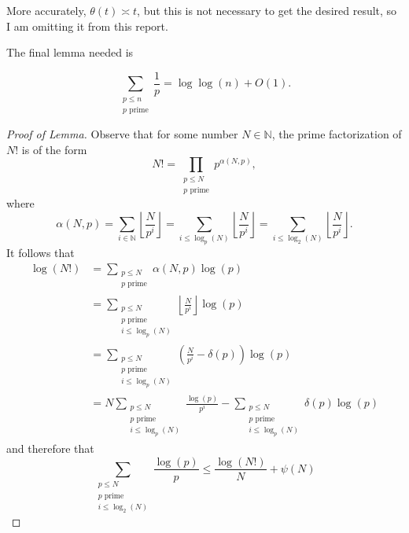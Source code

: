 \documentclass[12pt]{amsart}
\begin{document}
More accurately, \(\theta(t) \asymp t\), but this is not necessary to get the desired result,
so I am omitting it from this report.

The final lemma needed is
\begin{lemma*}
\[
    \sum _{\substack{ p \leq n \\ p\text{ prime}  }} \frac{1}{p}  = \log\log \left( n \right) + O(1)
.\]
\end{lemma*}

\begin{proof}[Proof of Lemma]
Observe that for some number \(N \in \mathbb{N} \), the prime factorization of \(N!\) is of the form
\[
    N! = \prod _{\substack{ p \leq N \\ p \text{ prime}  }} p ^{\alpha(N,p)}
,\]
where
\[
    \alpha(N,p) = \sum _{i \in \mathbb{N} } \left\lfloor \frac{N}{p ^{i}}  \right\rfloor = \sum _{i \leq \log _{p} \left( N \right) } \left\lfloor \frac{N}{p ^{i}}  \right\rfloor  =\sum _{i \leq \log _{2} \left( N \right) } \left\lfloor \frac{N}{p ^{i}}  \right\rfloor 
.\]
It follows that
\begin{align*}
    \log \left( N! \right) & = \sum _{\substack{ p \leq N \\p \text{ prime}  }} \alpha(N,p) \log \left( p \right) \\
    & = \sum _{\substack{ p \leq N \\p \text{ prime} \\ i \leq \log _{p} \left( N \right)   }} \left\lfloor \frac{N}{p ^{i}}  \right\rfloor \log \left( p \right) \\
    & = \sum _{\substack{ p \leq N \\ p \text{ prime} \\ i \leq \log _{p} \left( N \right)  }} \left( \frac{N}{p ^{i}} - \delta(p) \right) \log \left( p \right) \\
    & = N\sum _{\substack{ p \leq N \\ p \text{ prime} \\ i \leq \log _{p} \left( N \right) }} \frac{\log \left( p \right) }{p ^{i}} - \sum _{\substack{ p \leq N \\ p \text{ prime} \\ i \leq \log _{p} \left( N \right)  }} \delta(p) \log \left( p \right) 
\end{align*}
and therefore that
\[
    \sum _{\substack{ p \leq N \\ p \text{ prime} \\ i \leq \log _{2} \left( N \right)  }} \frac{\log \left( p \right) }{p} \leq  \frac{\log \left( N! \right) }{N} + \psi(N)
\]
\end{proof}
\end{document}
